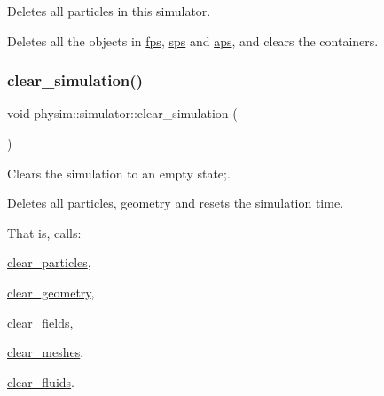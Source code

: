 Deletes all particles in this simulator. 

Deletes all the objects in \hyperlink{classphysim_1_1simulator_a4f92b1da1d5e8e0c35d6339991b4d7ce}{fps}, \hyperlink{classphysim_1_1simulator_ad3bc00314e9fd8435125ff1225c0658b}{sps} and \hyperlink{classphysim_1_1simulator_a838f036ef9d378d1e3f5207c3f031b52}{aps}, and clears the containers. \mbox{\label{classphysim_1_1simulator_a5881327d525fd4928fd274528863d9f7}} 
\subsubsection{\texorpdfstring{clear\+\_\+simulation()}{clear\_simulation()}}
{\footnotesize\ttfamily void physim\+::simulator\+::clear\+\_\+simulation (\begin{DoxyParamCaption}{ }\end{DoxyParamCaption})}



Clears the simulation to an empty state;. 

Deletes all particles, geometry and resets the simulation time.

That is, calls\+:
\begin{DoxyItemize}
\item \hyperlink{classphysim_1_1simulator_ade81dc85cbad0e86fc38b29f48fedcd6}{clear\+\_\+particles},
\item \hyperlink{classphysim_1_1simulator_a8112f43801df68b3140458d1915c8d97}{clear\+\_\+geometry},
\item \hyperlink{classphysim_1_1simulator_afe53c23ae11f78166576ad44f56ee953}{clear\+\_\+fields},
\item \hyperlink{classphysim_1_1simulator_a050e1ddeece122406b045262e40d4063}{clear\+\_\+meshes}.
\item \hyperlink{classphysim_1_1simulator_adda92bb271d38830fa374d61a160afeb}{clear\+\_\+fluids}. 
\end{DoxyItemize}\mbox{\label{classphysim_1_1simulator_a4aa10ffe26a505dfa9ad5e6875a2964f}} 
